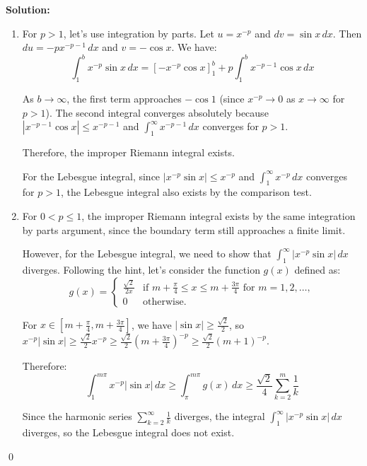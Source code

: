 \bigskip\noindent\textbf{Solution:}
\begin{enumerate}[label=(\alph*)]
    \item For $p > 1$, let's use integration by parts. Let $u = x^{-p}$ and $dv = \sin x \, dx$. Then $du = -px^{-p-1} \, dx$ and $v = -\cos x$. We have:
    \[\int_1^b x^{-p} \sin x \, dx = \left[-x^{-p} \cos x\right]_1^b + p \int_1^b x^{-p-1} \cos x \, dx\]
    
    As $b \to \infty$, the first term approaches $-\cos 1$ (since $x^{-p} \to 0$ as $x \to \infty$ for $p > 1$). The second integral converges absolutely because $|x^{-p-1} \cos x| \leq x^{-p-1}$ and $\int_1^\infty x^{-p-1} \, dx$ converges for $p > 1$.
    
    Therefore, the improper Riemann integral exists.
    
    For the Lebesgue integral, since $|x^{-p} \sin x| \leq x^{-p}$ and $\int_1^\infty x^{-p} \, dx$ converges for $p > 1$, the Lebesgue integral also exists by the comparison test.
    
    \item For $0 < p \leq 1$, the improper Riemann integral exists by the same integration by parts argument, since the boundary term still approaches a finite limit.
    
    However, for the Lebesgue integral, we need to show that $\int_1^\infty |x^{-p} \sin x| \, dx$ diverges. Following the hint, let's consider the function $g(x)$ defined as:
    \[g(x) = 
    \begin{cases} 
    \frac{\sqrt{2}}{2x} & \text{if } m + \frac{\pi}{4} \leq x \leq m + \frac{3\pi}{4} \text{ for } m = 1, 2, \ldots, \\ 
    0 & \text{otherwise}.
    \end{cases}\]
    
    For $x \in [m + \frac{\pi}{4}, m + \frac{3\pi}{4}]$, we have $|\sin x| \geq \frac{\sqrt{2}}{2}$, so $x^{-p} |\sin x| \geq \frac{\sqrt{2}}{2} x^{-p} \geq \frac{\sqrt{2}}{2} (m + \frac{3\pi}{4})^{-p} \geq \frac{\sqrt{2}}{2} (m + 1)^{-p}$.
    
    Therefore:
    \[\int_{1}^{m\pi} x^{-p} |\sin x| \, dx \geq \int_{\pi}^{m\pi} g(x) \, dx \geq \frac{\sqrt{2}}{4} \sum_{k=2}^{m} \frac{1}{k}\]
    
    Since the harmonic series $\sum_{k=2}^{\infty} \frac{1}{k}$ diverges, the integral $\int_1^\infty |x^{-p} \sin x| \, dx$ diverges, so the Lebesgue integral does not exist.
\end{enumerate}\qed


